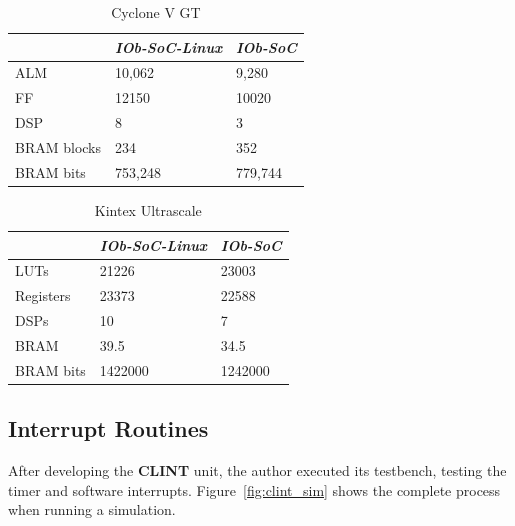 \begin{table}[!ht]
    \centering
    \begin{tabular}{l|l|l|}
        \cline{2-3}
                                          & \textit{IOb-SoC-Linux} & \textit{IOb-SoC} \\ \hline
        \multicolumn{1}{|l|}{ALM}         & 10,062                 & 9,280            \\ \hline
        \multicolumn{1}{|l|}{FF}          & 12150                  & 10020            \\ \hline
        \multicolumn{1}{|l|}{DSP}         & 8                      & 3                \\ \hline
        \multicolumn{1}{|l|}{BRAM blocks} & 234                    & 352              \\ \hline
        \multicolumn{1}{|l|}{BRAM bits}   & 753,248                & 779,744          \\ \hline
    \end{tabular}
    \caption{Cyclone V GT}
    \label{tab:cyclone_hello}
\end{table}
\begin{table}[!ht]
    \centering
    \begin{tabular}{l|l|l|}
        \cline{2-3}
                                        & \textit{IOb-SoC-Linux} & \textit{IOb-SoC} \\ \hline
        \multicolumn{1}{|l|}{LUTs}      & 21226                  & 23003            \\ \hline
        \multicolumn{1}{|l|}{Registers} & 23373                  & 22588            \\ \hline
        \multicolumn{1}{|l|}{DSPs}      & 10                     & 7                \\ \hline
        \multicolumn{1}{|l|}{BRAM}      & 39.5                   & 34.5             \\ \hline
        \multicolumn{1}{|l|}{BRAM bits} & 1422000                & 1242000          \\ \hline
    \end{tabular}
    \caption{Kintex Ultrascale}
    \label{tab:kintex_hello}
\end{table}

\subsection{Interrupt Routines}
After developing the \textbf{CLINT} unit, the author executed its testbench, testing the timer and software interrupts. Figure~\ref{fig:clint_sim} shows the complete process when running a simulation.

